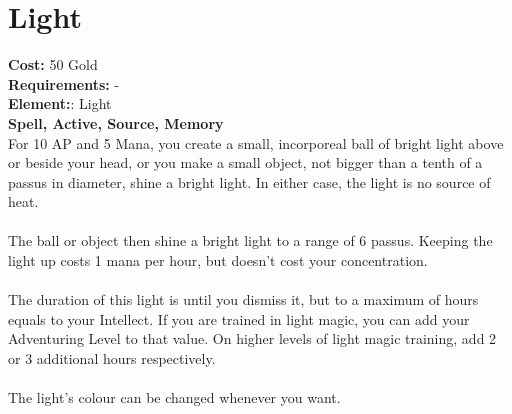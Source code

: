 \section*{Light}
\textbf{Cost:} 50 Gold\\
\textbf{Requirements:} -\\
\textbf{Element:}: Light\\
\textbf{Spell, Active, Source, Memory}\\
For 10 AP and 5 Mana, you create a small, incorporeal ball of bright light above or beside your head, or you make a small object, not bigger than a tenth of a passus in diameter, shine a bright light. In either case, the light is no source of heat.\\
\\
The ball or object then shine a bright light to a range of 6 passus. Keeping the light up costs 1 mana per hour, but doesn't cost your concentration.\\
\\
The duration of this light is until you dismiss it, but to a maximum of hours equals to your Intellect. If you are trained in light magic, you can add your Adventuring Level to that value. On higher levels of light magic training, add 2 or 3 additional hours respectively.\\
\\
The light's colour can be changed whenever you want.\\